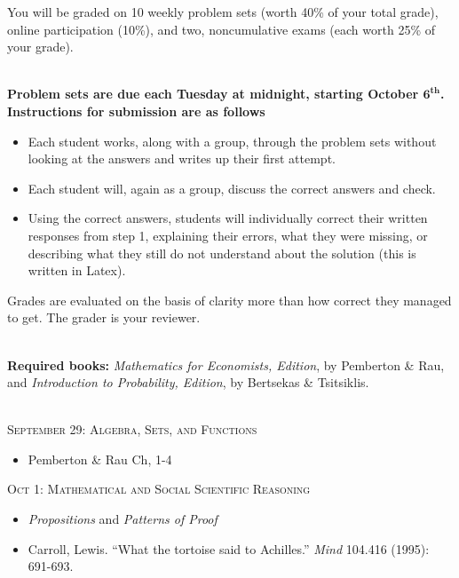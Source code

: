 \documentclass[11pt]{article}
\begin{document}
 You will be graded on 10 weekly problem sets (worth 40\% of your total grade), online participation (10\%), and two, noncumulative exams (each worth 25\% of your grade).  

\ \\{\bf Problem sets are due each Tuesday at midnight, starting October $\mathbf{6^{\text{th}}}$.  Instructions for submission are as follows}

\begin{itemize}
\item Each student works, along with a group, through the problem sets without looking at the answers and writes up their first attempt.
\item Each student will, again as a group, discuss the correct answers and check.
\item Using the correct answers, students will individually correct their written responses from step 1, explaining their errors, what they were missing, or describing what they still do not understand about the solution (this is written in Latex).
\end{itemize}
Grades are evaluated on the basis of clarity more than how correct they managed to get.  The grader is your reviewer.


\ \\{\bf Required books:} \textit{ Mathematics for Economists,  Edition},  by Pemberton \& Rau, and \textit{Introduction to Probability,  Edition}, by Bertsekas \& Tsitsiklis.


\newpage

\ \\ \noindent \textsc{September 29: Algebra, Sets, and Functions}

\begin{itemize}
\item Pemberton \& Rau Ch, 1-4

\end{itemize}




\noindent \textsc{Oct 1: Mathematical and Social Scientific Reasoning}

\begin{itemize}
\item \emph{Propositions} and \emph{Patterns of Proof}
\item Carroll, Lewis. ``What the tortoise said to Achilles.'' \emph{Mind} 104.416 (1995): 691-693.
\end{itemize}
\end{document}
